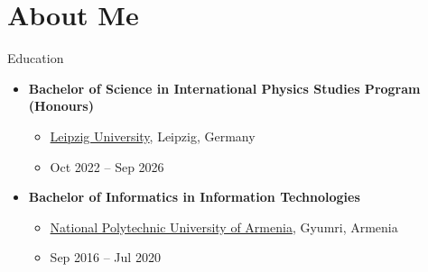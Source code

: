 \section[About Me]{About Me}

\begin{frame}{Education}
    \begin{itemize}
        \item \textbf{Bachelor of Science in International Physics Studies Program (Honours)}
        \begin{itemize}
            \item \href{https://www.uni-leipzig.de/}{Leipzig University}, Leipzig, Germany
            \item Oct 2022 -- Sep 2026
        \end{itemize}
        \vspace{0.5cm}
        \item \textbf{Bachelor of Informatics in Information Technologies}
        \begin{itemize}
            \item \href{https://www.polytech.am/en}{National Polytechnic University of Armenia}, Gyumri, Armenia
            \item Sep 2016 -- Jul 2020
        \end{itemize}
    \end{itemize}
\end{frame}

